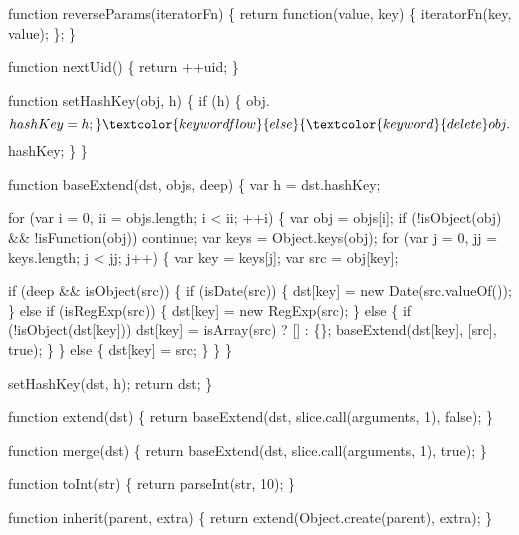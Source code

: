 \begin{DoxyCodeInclude}
\textcolor{keyword}{function} reverseParams(iteratorFn) \{
  \textcolor{keywordflow}{return} \textcolor{keyword}{function}(value, key) \{ iteratorFn(key, value); \};
\}

\textcolor{keyword}{function} nextUid() \{
  \textcolor{keywordflow}{return} ++uid;
\}


\textcolor{keyword}{function} setHashKey(obj, h) \{
  \textcolor{keywordflow}{if} (h) \{
    obj.$$hashKey = h;
  \} \textcolor{keywordflow}{else} \{
    \textcolor{keyword}{delete} obj.$$hashKey;
  \}
\}


\textcolor{keyword}{function} baseExtend(dst, objs, deep) \{
  var h = dst.$$hashKey;

  \textcolor{keywordflow}{for} (var i = 0, ii = objs.length; i < ii; ++i) \{
    var obj = objs[i];
    \textcolor{keywordflow}{if} (!isObject(obj) && !isFunction(obj)) \textcolor{keywordflow}{continue};
    var keys = Object.keys(obj);
    \textcolor{keywordflow}{for} (var j = 0, jj = keys.length; j < jj; j++) \{
      var key = keys[j];
      var src = obj[key];

      \textcolor{keywordflow}{if} (deep && isObject(src)) \{
        \textcolor{keywordflow}{if} (isDate(src)) \{
          dst[key] = \textcolor{keyword}{new} Date(src.valueOf());
        \} \textcolor{keywordflow}{else} \textcolor{keywordflow}{if} (isRegExp(src)) \{
          dst[key] = \textcolor{keyword}{new} RegExp(src);
        \} \textcolor{keywordflow}{else} \{
          \textcolor{keywordflow}{if} (!isObject(dst[key])) dst[key] = isArray(src) ? [] : \{\};
          baseExtend(dst[key], [src], \textcolor{keyword}{true});
        \}
      \} \textcolor{keywordflow}{else} \{
        dst[key] = src;
      \}
    \}
  \}

  setHashKey(dst, h);
  \textcolor{keywordflow}{return} dst;
\}

\textcolor{keyword}{function} extend(dst) \{
  \textcolor{keywordflow}{return} baseExtend(dst, slice.call(arguments, 1), \textcolor{keyword}{false});
\}


\textcolor{keyword}{function} merge(dst) \{
  \textcolor{keywordflow}{return} baseExtend(dst, slice.call(arguments, 1), \textcolor{keyword}{true});
\}



\textcolor{keyword}{function} toInt(str) \{
  \textcolor{keywordflow}{return} parseInt(str, 10);
\}


\textcolor{keyword}{function} inherit(parent, extra) \{
  \textcolor{keywordflow}{return} extend(Object.create(parent), extra);
\}


\end{DoxyCodeInclude}
